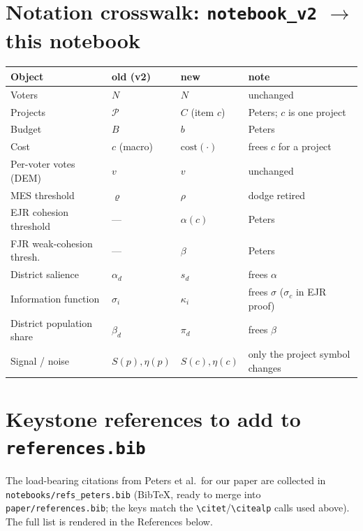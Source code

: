 \documentclass[11pt,letterpaper]{article}
\theoremstyle{definition}
\theoremstyle{plain}
\theoremstyle{remark}
\newcommand{\cost}{\mathrm{cost}}  %
\begin{document}
\appendix
\section{Notation crosswalk: \texttt{notebook\_v2} $\to$ this notebook}
\label{app:crosswalk}

\begin{center}\small\renewcommand{\arraystretch}{1.25}
\begin{tabularx}{\linewidth}{@{}lllX@{}}
\toprule
\textbf{Object} & \textbf{old (v2)} & \textbf{new} & \textbf{note} \\
\midrule
Voters                    & $N$          & $N$              & unchanged \\
Projects                  & $\mathcal{P}$ & $C$ (item $c$)   & Peters; $c$ is one project \\
Budget                    & $B$          & $b$              & Peters \\
Cost                      & $c$ (macro)  & $\cost(\cdot)$   & frees $c$ for a project \\
Per-voter votes (DEM)     & $v$          & $v$              & unchanged \\
MES threshold             & $\varrho$    & $\rho$           & dodge retired \\
EJR cohesion threshold    & ---          & $\alpha(c)$      & Peters \\
FJR weak-cohesion thresh. & ---          & $\beta$          & Peters \\
District salience         & $\alpha_d$   & $s_d$            & frees $\alpha$ \\
Information function       & $\sigma_i$   & $\kappa_i$       & frees $\sigma$ ($\sigma_c$ in EJR proof) \\
District population share & $\beta_d$    & $\pi_d$          & frees $\beta$ \\
Signal / noise            & $S(p),\eta(p)$ & $S(c),\eta(c)$ & only the project symbol changes \\
\bottomrule
\end{tabularx}
\end{center}

\section{Keystone references to add to \texttt{references.bib}}
\label{app:bib}

The load-bearing citations from Peters et al.\ for our paper are collected in
\texttt{notebooks/refs\_peters.bib} (BibTeX, ready to merge into \texttt{paper/references.bib}; the
keys match the \texttt{\textbackslash citet}/\texttt{\textbackslash citealp} calls used above). The
full list is rendered in the References below.
\end{document}
